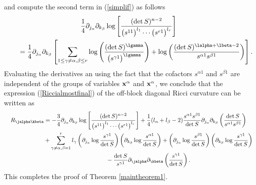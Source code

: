 and compute the second term in (\ref{simplif}) as follows
\begin{gather*}
\frac{1}{4}\partial_{j_{\alpha}}\partial_{k_{\beta}}\log\left[\frac{(\det S)^{n-2}}{\big(s^{11}\big)^{l_{1}}\cdots \big(s^{r1}\big)^{l_{r}}}\right]\\
\qquad{} =\frac{1}{4}\partial_{j_{\alpha}}\partial_{k_{\beta}}\left[ \sum_{1\leq \gamma \neq \alpha, \beta\leq r} \log\left( \frac{(\det S)^{\lgamma}}{\big(s^{\gamma 1}\big)^{\lgamma}}\right)+\log\left(\frac{(\det S)^{\lalpha+\lbeta-2}}{s^{\alpha 1}s^{\beta 1}}\right)\right].
\end{gather*}
Evaluating the derivatives an using the fact that the cofactors $s^{\alpha 1}$ and $s^{\beta 1}$ are independent of the groups of variables ${\bf x}^{\alpha}$ and ${\bf x}^{\alpha}$, we conclude that the expression (\ref{Riccialmostfinal}) of the off-block diagonal Ricci curvature can be written as
\begin{gather*}
R_{\jalpha \kbeta} =-\frac{3}{4}\partial_{j_{\alpha}}\partial_{k_{\beta}}\log\left[\frac{(\det S)^{n-2}}{\big(s^{11}\big)^{l_{1}}\cdots \big(s^{r1}\big)^{l_{r}}}\right] + \frac{1}{4} (l_{\alpha}+l_{\beta}-2)\frac{s^{\alpha 1}s^{\beta 1}}{\det S}\partial_{j_{\alpha}}\partial_{k_{\beta}}\left(\frac{\det S}{s^{\alpha 1}s^{\beta 1}}\right)\\
\hphantom{R_{\jalpha \kbeta} =}{}+
\sum_{\gamma\neq \alpha,\beta=1}^{r}l_{\gamma}\left(\partial_{j_{\alpha}}\log\frac{s^{\gamma 1}}{\det S}\right)\left(\partial_{k_{\beta}}\log\frac{s^{\alpha 1}}{\det S}\right)
+\left(\partial_{j_{\alpha}}\log\frac{s^{\beta 1}}{\det S}\right)\left(\partial_{k_{\beta}}\log\frac{s^{\gamma 1}}{\det S}\right)\\
\hphantom{R_{\jalpha \kbeta} =}{}
-\frac{\det S}{s^{\gamma 1}}\partial_{\jalpha}\partial_{\kbeta}\left(\frac{s^{\gamma 1}}{\det S}\right).
\end{gather*}
This completes the proof of Theorem \ref{maintheorem1}.
